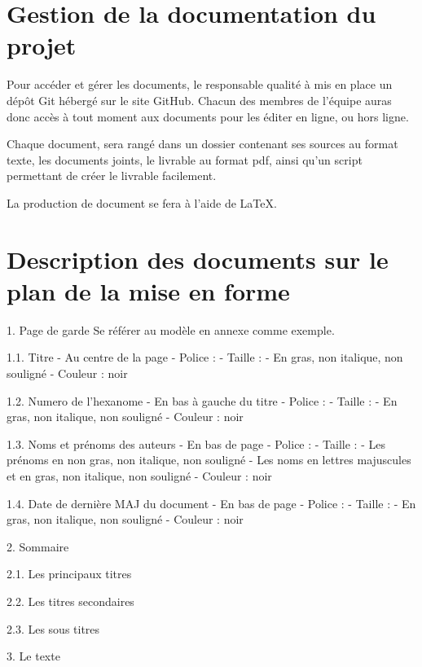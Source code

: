 \section{Gestion de la documentation du projet}

Pour accéder et gérer les documents, le responsable qualité à mis en place un dépôt Git hébergé sur le site GitHub.
Chacun des membres de l’équipe auras donc accès à tout moment aux documents pour les éditer en ligne, ou hors ligne.


Chaque document, sera rangé dans un dossier contenant ses sources au format texte, les documents joints, le livrable au format pdf, ainsi qu'un script permettant de créer le livrable facilement.

La production de document se fera à l’aide de LaTeX.


\section{Description des documents sur le plan de la mise en forme}


1. Page de garde
   Se référer au modèle en annexe comme exemple.

   1.1. Titre
        - Au centre de la page
        - Police : 
        - Taille : 
        - En gras, non italique, non souligné
        - Couleur : noir

   1.2. Numero de l'hexanome
        - En bas à gauche du titre
        - Police : 
        - Taille : 
        - En gras, non italique, non souligné
        - Couleur : noir

   1.3. Noms et prénoms des auteurs
        - En bas de page
        - Police : 
        - Taille : 
        - Les prénoms en non gras, non italique, non souligné
        - Les noms en lettres majuscules et en gras, non italique, non souligné
        - Couleur : noir

   1.4. Date de dernière MAJ du document
        - En bas de page
        - Police : 
        - Taille : 
        - En gras, non italique, non souligné
        - Couleur : noir

2. Sommaire

   2.1. Les principaux titres

   2.2. Les titres secondaires

   2.3. Les sous titres

3. Le texte


